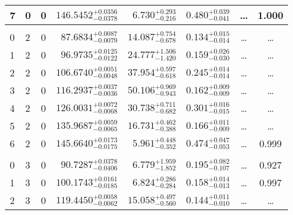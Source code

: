 \begin{table*}[!]
\begin{tabular}{llcrrlrc}
7 & 0 & 0 & $    146.5452_{-      0.0378}^{+      0.0356}$ & $       6.730_{-       0.216}^{+       0.293}$ & $       0.480_{-       0.041}^{+       0.039}$ & \multicolumn{1}{c}{\dots} & 1.000\\[1pt]
\hline \\[-8pt]
0 & 2 & 0 & $     87.6834_{-      0.0079}^{+      0.0087}$ & $      14.087_{-       0.678}^{+       0.754}$ & $       0.134_{-       0.014}^{+       0.015}$ & \multicolumn{1}{c}{\dots} & \dots \\[1pt]
1 & 2 & 0 & $     96.9735_{-      0.0122}^{+      0.0125}$ & $      24.777_{-       1.420}^{+       1.506}$ & $       0.159_{-       0.030}^{+       0.026}$ & \multicolumn{1}{c}{\dots} & \dots \\[1pt]
2 & 2 & 0 & $    106.6740_{-      0.0048}^{+      0.0051}$ & $      37.954_{-       0.618}^{+       0.597}$ & $       0.245_{-       0.014}^{+       0.014}$ & \multicolumn{1}{c}{\dots} & \dots \\[1pt]
3 & 2 & 0 & $    116.2937_{-      0.0036}^{+      0.0037}$ & $      50.106_{-       0.943}^{+       0.969}$ & $       0.162_{-       0.009}^{+       0.009}$ & \multicolumn{1}{c}{\dots} & \dots \\[1pt]
4 & 2 & 0 & $    126.0031_{-      0.0068}^{+      0.0072}$ & $      30.738_{-       0.682}^{+       0.711}$ & $       0.301_{-       0.015}^{+       0.016}$ & \multicolumn{1}{c}{\dots} & \dots\\[1pt]
5 & 2 & 0 & $    135.9687_{-      0.0065}^{+      0.0059}$ & $      16.731_{-       0.388}^{+       0.462}$ & $       0.166_{-       0.009}^{+       0.011}$ & \multicolumn{1}{c}{\dots} & \dots \\[1pt]
6 & 2 & 0 & $    145.6640_{-      0.0175}^{+      0.0173}$ & $       5.961_{-       0.352}^{+       0.448}$ & $       0.474_{-       0.053}^{+       0.047}$ & \multicolumn{1}{c}{\dots} & 0.999\\[1pt]
\hline \\[-8pt]
0 & 3 & 0 & $     90.7287_{-      0.0406}^{+      0.0378}$ & $       6.779_{-       1.852}^{+       1.959}$ & $       0.195_{-       0.107}^{+       0.082}$ & \multicolumn{1}{c}{\dots} & 0.927\\[1pt]
1 & 3 & 0 & $    100.1743_{-      0.0185}^{+      0.0161}$ & $       6.824_{-       0.284}^{+       0.286}$ & $       0.158_{-       0.013}^{+       0.014}$ & \multicolumn{1}{c}{\dots} & 0.997\\[1pt]
2 & 3 & 0 & $    119.4450_{-      0.0062}^{+      0.0058}$ & $      15.058_{-       0.560}^{+       0.497}$ & $       0.144_{-       0.010}^{+       0.011}$ & \multicolumn{1}{c}{\dots} & \dots \\[1pt]

\end{tabular}
\end{table*}
